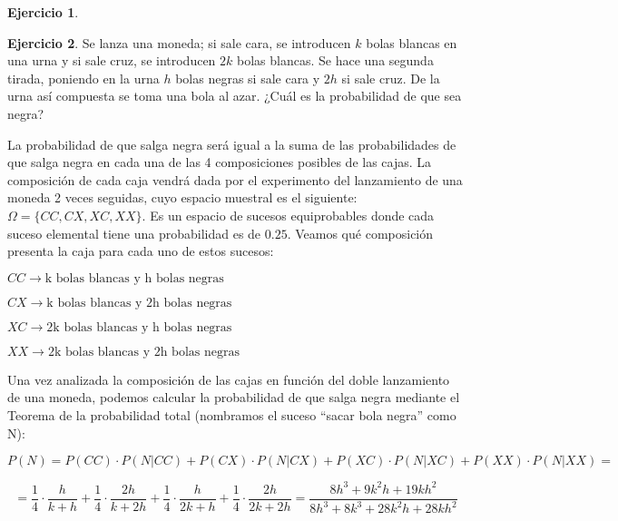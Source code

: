 \documentclass[a4paper, 12pt]{article}
\theoremstyle{definition}
\newtheorem{ej}{Ejercicio}
\begin{document}
\begin{ej}
\end{ej}

\begin{ej}
Se lanza una moneda; si sale cara, se introducen $k$ bolas blancas en una urna y si sale cruz, se
introducen $2k$ bolas blancas. Se hace una segunda tirada, poniendo en la urna $h$ bolas negras
si sale cara y $2h$ si sale cruz. De la urna así compuesta se toma una bola al azar. ¿Cuál es la
probabilidad de que sea negra?


\medskip

La probabilidad de que salga negra será igual a la suma de las probabilidades de que salga negra en cada una de las 4 composiciones posibles de las cajas. La composición de cada caja vendrá dada por el experimento del lanzamiento de una moneda 2 veces seguidas, cuyo espacio muestral es el siguiente: $\Omega = \{CC,CX,XC,XX\}$. Es un espacio de sucesos equiprobables donde cada suceso elemental tiene una probabilidad es de $0.25$. Veamos qué composición presenta la caja para cada uno de estos sucesos:

\begin{center}
    $CC \longrightarrow \text{k bolas blancas y h bolas negras}$
    
    $CX \longrightarrow \text{k bolas blancas y 2h bolas negras}$
    
    $XC \longrightarrow \text{2k bolas blancas y h bolas negras}$
    
    $XX \longrightarrow \text{2k bolas blancas y 2h bolas negras}$
\end{center}

\newpage

Una vez analizada la composición de las cajas en función del doble lanzamiento de una moneda, podemos calcular la probabilidad de que salga negra mediante el Teorema de la probabilidad total (nombramos el suceso ``sacar bola negra'' como N):

\begin{center}
    $P(N) = P(CC) \cdot P(N|CC) + P(CX) \cdot P(N|CX) + P(XC) \cdot P(N|XC) + P(XX) \cdot P(N|XX) = $
\end{center}

\[
    = \frac{1}{4} \cdot \frac{h}{k+h} + \frac{1}{4} \cdot \frac{2h}{k+2h} + \frac{1}{4} \cdot \frac{h}{2k+h} + \frac{1}{4} \cdot \frac{2h}{2k+2h} = \frac{8h^3+9k^{2}h+19kh^2}{8h^3+8k^3+28k^{2}h+28kh^2}
\]
\end{ej}
\end{document}
